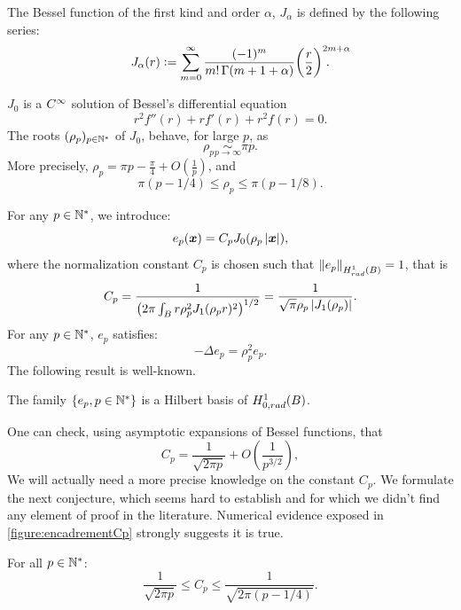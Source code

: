 \documentclass{article}
\begin{document}
\begin{definition}
	\label{defJ0}
	The Bessel function of the first kind and order $\alpha$, $J_\alpha$ is defined by the following series: 
	\begin{equation}
		\label{J0powerSeries}
		J_\alpha(r) \isdef \sum_{m=0}^\infty \frac{(-1)^m}{m! \, \Gamma(m+1+\alpha)} {\bigg(\frac{r}{2}\bigg)}^{2m+\alpha}\!\!\!\!\!\!\!\!\!\!\!\!.
	\end{equation}
\end{definition}
\noindent $J_0$ is a $C^{\infty}$ solution of Bessel's differential equation 
\begin{equation}
	\label{BesselDifferentialEquation}
	r^2f''(r) + r f'(r) + r^2 f(r) = 0.
\end{equation}
The roots $(\rho_p)_{p \in \mathbb{N}^*}$ of $J_0$, behave, for large $p$, as 
\[ \rho_p \underset{p \to \infty}{\sim} \pi p.\]
More precisely, $\rho_p = \pi p - \frac{\pi}{4} + O\left(\frac{1}{p}\right)$, and
\begin{equation}
	\pi(p - 1/4)\leq \rho_p \leq \pi(p - 1/8).
	\label{EncadrementRhop}
\end{equation}

\noindent For any $p\in \mathbb{N}^*$, we introduce:
\[e_p(\boldsymbol{x}) = C_p J_0(\rho_p \left\lvert \boldsymbol{x} \right\rvert),\]
where the normalization constant $C_p$ is chosen such that $\left\|e_p\right\|_{H^1_{rad}(B)} = 1$, that is  
\[C_p = \dfrac{1}{\left(2\pi \int_B  r \rho_p^2 J_1 (\rho_p r)^2\right)^{1/2}} = \dfrac{1}{\sqrt{\pi}\rho_p\left\lvert J_1(\rho_p) \right\rvert}.\]
\noindent For any $p \in \mathbb{N}^*$, $e_p$ satisfies:
\begin{equation}
	\label{epEstUnVP}
	-\Delta e_p = \rho_p^2 e_p.
\end{equation}
The following result is well-known.
\begin{Theorem} 
	\label{epEstUneBaseDeHilbert}
	The family $\left\{e_p, p\in \mathbb{N}^*\right\}$ is a Hilbert basis of $H^1_{0,rad}(B)$.
\end{Theorem}

One can check, using asymptotic expansions of Bessel functions, that
\begin{equation}
	\label{equivalentCp}
	C_p = \dfrac{1}{\sqrt{2 \pi p}} + O\left(\frac{1}{p^{3/2}}\right), 
\end{equation}
We will actually need a more precise knowledge on the constant $C_p$. We formulate the next conjecture, which seems hard to establish and for which we didn't find any element of proof in the literature. Numerical evidence exposed in \autoref{figure:encadrementCp} strongly suggests it is true. 
\begin{conjecture} 
	\label{ConjCp}
	For all $p \in \mathbb{N}^*$:
	\begin{equation}
		\label{EncadrementCp}
		\frac{1}{\sqrt{2\pi p}} \leq C_p \leq \frac{1}{\sqrt{2\pi (p-1/4)}}.
	\end{equation}
\end{conjecture}
\end{document}
